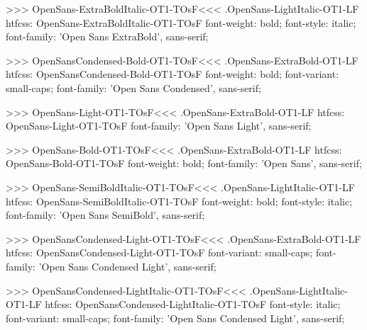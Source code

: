 >>>
\<OpenSans-ExtraBoldItalic-OT1-TOsF\><<<
.OpenSans-LightItalic-OT1-LF
htfcss:  OpenSans-ExtraBoldItalic-OT1-TOsF  font-weight: bold; font-style: italic; font-family: 'Open Sans ExtraBold', sans-serif;

>>>
\<OpenSansCondensed-Bold-OT1-TOsF\><<<
.OpenSans-ExtraBold-OT1-LF
htfcss:  OpenSansCondensed-Bold-OT1-TOsF  font-weight: bold; font-variant: small-caps; font-family: 'Open Sans Condensed', sans-serif;

>>>
\<OpenSans-Light-OT1-TOsF\><<<
.OpenSans-ExtraBold-OT1-LF
htfcss:  OpenSans-Light-OT1-TOsF  font-family: 'Open Sans Light', sans-serif;

>>>
\<OpenSans-Bold-OT1-TOsF\><<<
.OpenSans-ExtraBold-OT1-LF
htfcss:  OpenSans-Bold-OT1-TOsF  font-weight: bold; font-family: 'Open Sans', sans-serif;

>>>
\<OpenSans-SemiBoldItalic-OT1-TOsF\><<<
.OpenSans-LightItalic-OT1-LF
htfcss:  OpenSans-SemiBoldItalic-OT1-TOsF  font-weight: bold; font-style: italic; font-family: 'Open Sans SemiBold', sans-serif;

>>>
\<OpenSansCondensed-Light-OT1-TOsF\><<<
.OpenSans-ExtraBold-OT1-LF
htfcss:  OpenSansCondensed-Light-OT1-TOsF  font-variant: small-caps; font-family: 'Open Sans Condensed Light', sans-serif;

>>>
\<OpenSansCondensed-LightItalic-OT1-TOsF\><<<
.OpenSans-LightItalic-OT1-LF
htfcss:  OpenSansCondensed-LightItalic-OT1-TOsF  font-style: italic; font-variant: small-caps; font-family: 'Open Sans Condensed Light', sans-serif;


